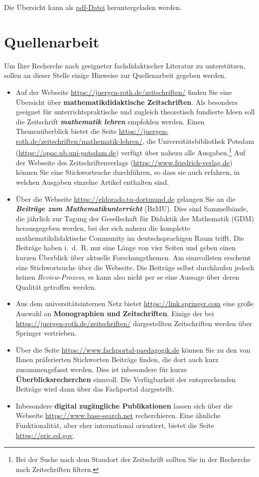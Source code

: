 \documentclass[
]{scrbook}
\theoremstyle{definition}
\theoremstyle{definition}
\theoremstyle{definition}
\theoremstyle{definition}
\theoremstyle{remark}
\begin{document}
Die Übersicht kann als \href{files/Stoffdidaktik2024-OrientierungshilfeLernprozesseAusloesen.pdf}{pdf-Datei} heruntergeladen werden.

\chapter{Quellenarbeit}\label{quellenarbeit}

Um Ihre Recherche nach geeigneter fachdidaktischer Literatur zu unterstützen, sollen an dieser Stelle einige Hinweise zur Quellenarbeit gegeben werden.

\begin{itemize}
\item
  Auf der Webseite \url{https://juergen-roth.de/zeitschriften/} finden Sie eine Übersicht über \textbf{mathematikdidaktische Zeitschriften}. Als besonders geeignet für unterrichtspraktische und zugleich theoretisch fundierte Ideen soll die Zeitschrift \textbf{\emph{mathematik lehren}} empfohlen werden. Einen Themenüberblick bietet die Seite \url{https://juergen-roth.de/zeitschriften/mathematik-lehren/}, die Universitätsbibliothek Potsdam (\url{https://opac.ub.uni-potsdam.de}) verfügt über nahezu alle Ausgaben.\footnote{Bei der Suche nach dem Standort der Zeitschrift sollten Sie in der Recherche nach Zeitschriften filtern.} Auf der Webseite des Zeitschriftenverlags (\url{https://www.friedrich-verlag.de}) können Sie eine Stichwortsuche durchführen, so dass sie auch erfahren, in welchen Ausgaben einzelne Artikel enthalten sind.
\item
  Über die Webseite \url{https://eldorado.tu-dortmund.de} gelangen Sie an die \textbf{\emph{Beiträge zum Mathematikunterricht}} (BzMU). Dies sind Sammelbände, die jährlich zur Tagung der Gesellschaft für Didaktik der Mathematik (GDM) herausgegeben werden, bei der sich nahezu die komplette mathematikdidaktische Community im deutschsprachigen Raum trifft. Die Beiträge haben i.~d.~R. nur eine Länge von vier Seiten und geben einen kurzen Überblick über aktuelle Forschungsthemen. Am sinnvollsten erscheint eine Stichwortsuche über die Webseite. Die Beiträge selbst durchlaufen jedoch keinen \emph{Review-Prozess}, es kann also nicht per se eine Aussage über deren Qualität getroffen werden.
\item
  Aus dem universitätsinternen Netz bietet \url{https://link.springer.com} eine große Auswahl an \textbf{Monographien und Zeitschriften}. Einige der bei \url{https://juergen-roth.de/zeitschriften/} dargestellten Zeitschriften werden über Springer vertrieben.
\item
  Über die Seite \url{https://www.fachportal-paedagogik.de} können Sie zu den von Ihnen präferierten Stichworten Beiträge finden, die dort auch kurz zusammengefasst werden. Dies ist inbesondere für kurze \textbf{Überblicksrecherchen} sinnvoll. Die Verfügbarkeit der entsprechenden Beiträge wird dann über das Fachportal dargestellt.
\item
  Inbesondere \textbf{digital zugängliche Publikationen} lassen sich über die Webseite \url{https://www.base-search.net} recherchieren. Eine ähnliche Funktionalität, aber eher international orientiert, bietet die Seite \url{https://eric.ed.gov}.
\end{itemize}
\end{document}
